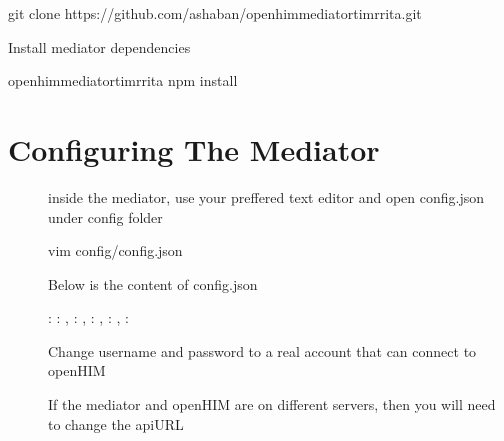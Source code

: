 \documentclass[letterpaper,10pt,english]{sphinxmanual}
\begin{document}
\begin{sphinxVerbatim}[commandchars=\\\{\}]
git clone https://github.com/ashaban/openhim\PYGZhy{}mediator\PYGZhy{}timr\PYGZhy{}rita.git
\end{sphinxVerbatim}

\sphinxAtStartPar
Install mediator dependencies

\begin{sphinxVerbatim}[commandchars=\\\{\}]
 openhim\PYGZhy{}mediator\PYGZhy{}timr\PYGZhy{}rita
npm install
\end{sphinxVerbatim}


\chapter{Configuring The Mediator}
\label{\detokenize{configuration:configuring-the-mediator}}\label{\detokenize{configuration::doc}}\begin{description}
\item[{}] \leavevmode
\sphinxAtStartPar
inside the mediator, use your preffered text editor and open config.json under config folder

\begin{sphinxVerbatim}[commandchars=\\\{\}]
vim config/config.json
\end{sphinxVerbatim}

\sphinxAtStartPar
Below is the content of config.json

\begin{sphinxVerbatim}[commandchars=\\\{\}]
  : 
    : ,
    : ,
    : ,
    : 
  ,
  : 
\end{sphinxVerbatim}

\sphinxAtStartPar
Change username and password to a real account that can connect to openHIM

\sphinxAtStartPar
If the mediator and openHIM are on different servers, then you will need to change the apiURL

\end{description}
\end{document}
